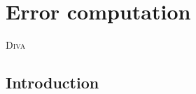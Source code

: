 \chapter{Error computation\label{chap:error}}
\vspace*{-1cm}
\lettrine[lines=2, loversize=-0.1, lraise=0.1]{D}{iva} 

\minitoc


\section{Introduction}


